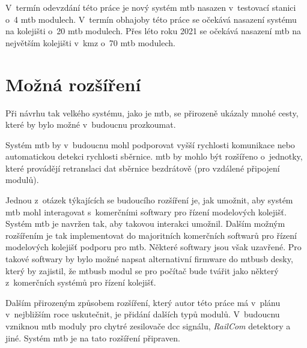 V~termín odevzdání této práce je nový systém \gls{mtb} nasazen v~testovací
stanici o~4 \gls{mtb} modulech. V~termín obhajoby této práce se očekává nasazení
systému na kolejišti o~20 \gls{mtb} modulech. Přes léto roku 2021 se očekává
nasazení \gls{mtb} na největším kolejišti v~\gls{kmz} o~70 \gls{mtb} modulech.

\section{Možná rozšíření} \label{sec:future}

Při návrhu tak velkého systému, jako je \gls{mtb}, se přirozeně ukázaly mnohé
cesty, které by bylo možné v~budoucnu prozkoumat.

Systém \gls{mtb} by v~budoucnu mohl podporovat vyšší rychlosti komunikace nebo
automatickou detekci rychlosti sběrnice. \gls{mtb} by mohlo být rozšířeno
o~jednotky, které provádějí retranslaci dat sběrnice bezdrátově (pro vzdálené
připojení modulů).

Jednou z~otázek týkajících se budoucího rozšíření je, jak umožnit, aby systém
\gls{mtb} mohl interagovat s~komerčními softwary pro řízení modelových
kolejišť. Systém \gls{mtb} je navržen tak, aby takovou interakci umožnil.
Dalším možným rozšířením je tak implementovat do majoritních komerčních
softwarů pro řízení modelových kolejišť podporu pro \gls{mtb}. Některé softwary
jsou však uzavřené. Pro takové softwary by bylo možné napsat alternativní
firmware do \gls{mtbusb} desky, který by zajistil, že \gls{mtbusb} modul se pro
počítač bude tvářit jako některý z~komerčních systémů pro řízení kolejišť.

Dalším přirozeným způsobem rozšíření, který autor této práce má v~plánu
v~nejbližším roce uskutečnit, je přidání dalších typů modulů. V~budoucnu
vzniknou \gls{mtb} moduly pro chytré zesilovače \gls{dcc} signálu,
\textit{RailCom} detektory a jiné. Systém \gls{mtb} je na tato rozšíření
připraven.

